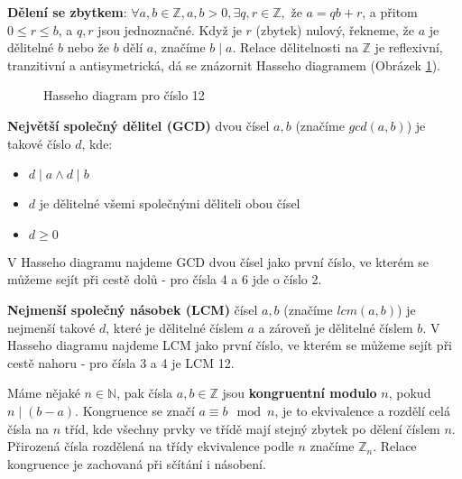 \documentclass[10pt,a4paper]{article}
\begin{document}
\textbf{Dělení se zbytkem}: $\forall a, b \in \mathbb{Z}, a, b > 0, \exists q, r \in \mathbb{Z},$ že $ a = qb + r$, a přitom $0 \leq r \le b$, a $q, r$ jsou jednoznačné. Když je $r$ (zbytek) nulový, řekneme, že $a$ je dělitelné $b$ nebo že $b$ dělí $a$, značíme $b \mid a$. Relace dělitelnosti na $\mathbb{Z}$ je reflexivní, tranzitivní a antisymetrická, dá se znázornit Hasseho diagramem (Obrázek \ref{fig:hasse}).

\begin{figure}[h!]
\label{fig:hasse}
\centering
{}
\caption{Hasseho diagram pro číslo 12}
\end{figure}

\textbf{Největší společný dělitel (GCD)} dvou čísel $a, b$ (značíme $gcd(a,b)$) je takové číslo $d$, kde:
\begin{itemize}
\item $d \mid a \wedge d \mid b$
\item $d$ je dělitelné všemi společnými děliteli obou čísel
\item $d \geq 0$
\end{itemize}
V Hasseho diagramu najdeme GCD dvou čísel jako první číslo, ve kterém se můžeme sejít při cestě dolů - pro čísla 4 a 6 jde o číslo 2.

\textbf{Nejmenší společný násobek (LCM)} čísel $a, b$ (značíme $lcm(a, b)$) je nejmenší takové $d$, které je dělitelné číslem $a$ a zároveň je dělitelné číslem $b$. V Hasseho diagramu najdeme LCM jako první číslo, ve kterém se můžeme sejít při cestě nahoru - pro čísla 3 a 4 je LCM 12.

Máme nějaké $n \in \mathbb{N}$, pak čísla $a, b \in \mathbb{Z}$ jsou \textbf{kongruentní modulo} $n$, pokud $n \mid (b-a)$. Kongruence se značí $a \equiv b\mod n$, je to ekvivalence a rozdělí celá čísla na $n$ tříd, kde všechny prvky ve třídě mají stejný zbytek po dělení číslem $n$. Přirozená čísla rozdělená na třídy ekvivalence podle $n$ značíme $\mathbb{Z}_n$. Relace kongruence je zachovaná při sčítání i násobení.
\end{document}
